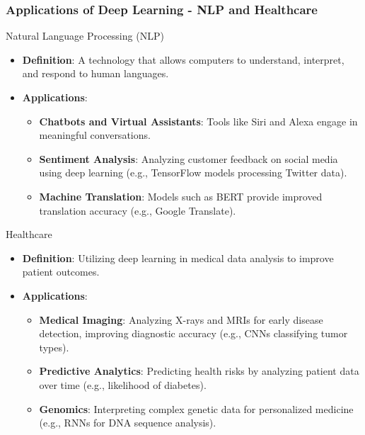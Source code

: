 \documentclass[aspectratio=169]{beamer}
\begin{document}
\begin{frame}[fragile]
    \frametitle{Applications of Deep Learning - NLP and Healthcare}
    \begin{block}{Natural Language Processing (NLP)}
        \begin{itemize}
            \item \textbf{Definition}: A technology that allows computers to understand, interpret, and respond to human languages.
            \item \textbf{Applications}:
            \begin{itemize}
                \item \textbf{Chatbots and Virtual Assistants}: Tools like Siri and Alexa engage in meaningful conversations.
                \item \textbf{Sentiment Analysis}: Analyzing customer feedback on social media using deep learning (e.g., TensorFlow models processing Twitter data).
                \item \textbf{Machine Translation}: Models such as BERT provide improved translation accuracy (e.g., Google Translate).
            \end{itemize}
        \end{itemize}
    \end{block}
    
    \begin{block}{Healthcare}
        \begin{itemize}
            \item \textbf{Definition}: Utilizing deep learning in medical data analysis to improve patient outcomes.
            \item \textbf{Applications}:
            \begin{itemize}
                \item \textbf{Medical Imaging}: Analyzing X-rays and MRIs for early disease detection, improving diagnostic accuracy (e.g., CNNs classifying tumor types).
                \item \textbf{Predictive Analytics}: Predicting health risks by analyzing patient data over time (e.g., likelihood of diabetes).
                \item \textbf{Genomics}: Interpreting complex genetic data for personalized medicine (e.g., RNNs for DNA sequence analysis).
            \end{itemize}
        \end{itemize}
    \end{block}
\end{frame}
\end{document}
